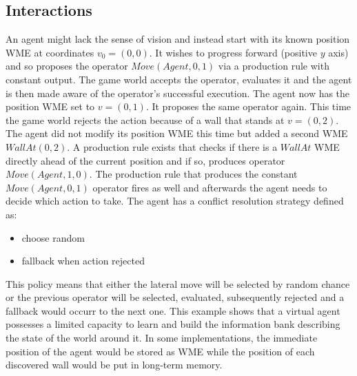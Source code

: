 \subsection{Interactions}

An agent might lack the sense of vision and instead start with its known position WME at coordinates $v_0=(0, 0)$.
It wishes to progress forward (positive $y$ axis) and so proposes the operator $Move(Agent, 0, 1)$ via a production rule with constant output.
The game world accepts the operator, evaluates it and the agent is then made aware of the operator's successful execution.
The agent now has the position WME set to $v=(0, 1)$.
It proposes the same operator again.
This time the game world rejects the action because of a wall that stands at $v=(0, 2)$.
The agent did not modify its position WME this time but added a second WME $WallAt(0, 2)$.
A production rule exists that checks if there is a $WallAt$ WME directly ahead of the current position and if so, produces operator $Move(Agent, 1, 0)$.
The production rule that produces the constant $Move(Agent, 0, 1)$ operator fires as well and afterwards the agent needs to decide which action to take.
The agent has a conflict resolution strategy defined as:

\begin{itemize}
    \item choose random
    \item fallback when action rejected
\end{itemize}

This policy means that either the lateral move will be selected by random chance or the previous operator will be selected, evaluated, subsequently rejected and a fallback would occurr to the next one.
This example shows that a virtual agent possesses a limited capacity to learn and build the information bank describing the state of the world around it.
In some implementations, the immediate position of the agent would be stored as WME while the position of each discovered wall would be put in long-term memory.


